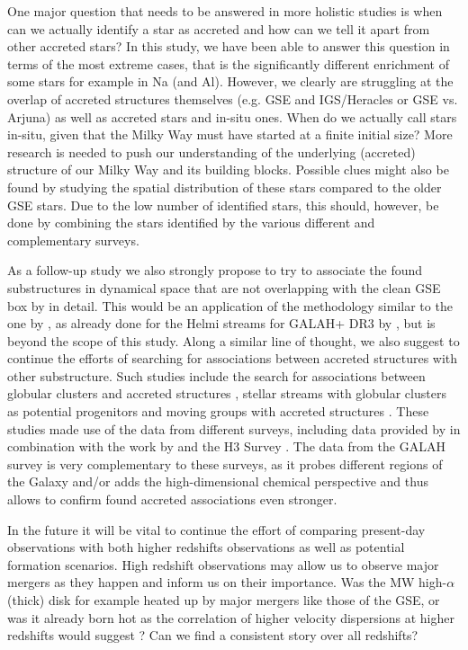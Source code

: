 \documentclass[fleqn,usenatbib]{mnras}
\begin{document}
One major question that needs to be answered in more holistic studies is when can we actually identify a star as accreted and how can we tell it apart from other accreted stars? In this study, we have been able to answer this question in terms of the most extreme cases, that is the significantly different enrichment of some stars for example in Na (and Al). However, we clearly are struggling at the overlap of accreted structures themselves (e.g. GSE and IGS/Heracles or GSE vs. Arjuna) as well as accreted stars and in-situ ones. When do we actually call stars in-situ, given that the Milky Way must have started at a finite initial size? More research is needed to push our understanding of the underlying (accreted) structure of our Milky Way and its building blocks. Possible clues might also be found by studying the spatial distribution of these stars compared to the older GSE stars. Due to the low number of identified stars, this should, however, be done by combining the stars identified by the various different and complementary surveys.

As a follow-up study we also strongly propose to try to associate the found substructures in dynamical space that are not overlapping with the clean GSE box by \citet{Feuillet2021} in detail. This would be an application of the methodology similar to the one by \citet{Naidu2020}, as already done for the Helmi streams for GALAH+ DR3 by \citet{Limberg2021}, but is beyond the scope of this study. Along a similar line of thought, we also suggest to continue the efforts of searching for associations between accreted structures with other substructure. Such studies include the search for associations between globular clusters and accreted structures \citep{Massari2019}, stellar streams with globular clusters as potential progenitors \citep{Bonaca2021} and moving groups with accreted structures \citep{Schuler2021}. These studies made use of the data from different surveys, including data provided by \cite{Helmi2018b} in combination with the work by \citet{Vasiliev2019} and the H3 Survey \citep{Conroy2019}. The data from the GALAH survey is very complementary to these surveys, as it probes different regions of the Galaxy and/or adds the high-dimensional chemical perspective and thus allows to confirm found accreted associations even stronger.


In the future it will be vital to continue the effort of comparing present-day observations with both higher redshifts observations as well as potential formation scenarios. High redshift observations may allow us to observe major mergers as they happen and inform us on their importance. Was the MW high-$\alpha$ (thick) disk for example heated up by major mergers like those of the GSE, or was it already born hot as the correlation of higher velocity dispersions at higher redshifts would suggest \citep{Wisnioski2015, Leaman2017}? Can we find a consistent story over all redshifts?
\end{document}
